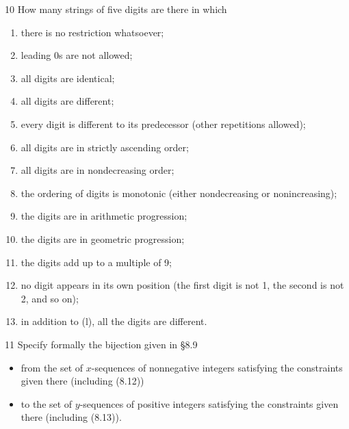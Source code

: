 \begin{exercise}{10}
    How many strings of five digits are there in which
    \begin{enumerate}[label=(\alph*)]
        \item there is no restriction whatsoever;
        \item leading 0s are not allowed;
        \item all digits are identical;
        \item all digits are different;
        \item every digit is different to its predecessor (other repetitions
              allowed);
        \item all digits are in strictly ascending order;
        \item all digits are in nondecreasing order;
        \item the ordering of digits is monotonic (either nondecreasing or
              nonincreasing);
        \item the digits are in arithmetic progression;
        \item the digits are in geometric progression;
        \item the digits add up to a multiple of 9;
        \item no digit appears in its own position (the first digit is not 1,
              the second is not 2, and so on);
        \item in addition to (l), all the digits are different.
    \end{enumerate}
\end{exercise}

\begin{exercise}{11}
    Specify formally the bijection given in \S8.9
    \begin{itemize}
        \item from the set of $x$-sequences of nonnegative integers satisfying
              the constraints given there (including (8.12))
        \item to the set of $y$-sequences of positive integers satisfying the
              constraints given there (including (8.13)).
    \end{itemize}
\end{exercise}
